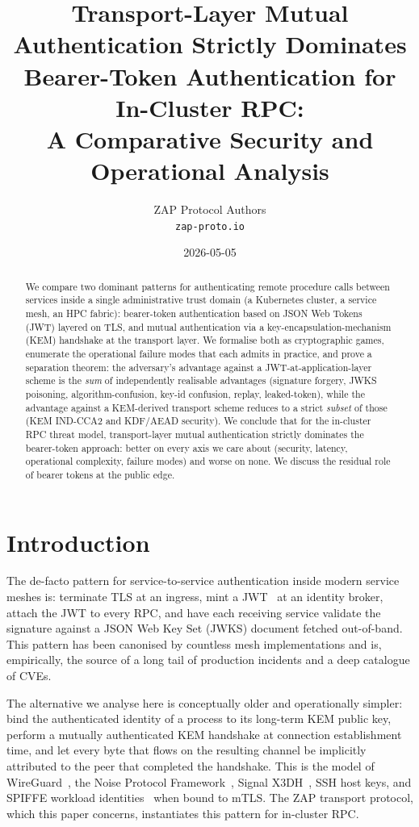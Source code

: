 \documentclass[11pt,a4paper]{article}
\title{Transport-Layer Mutual Authentication Strictly Dominates\\
       Bearer-Token Authentication for In-Cluster RPC:\\
       A Comparative Security and Operational Analysis}
\author{ZAP Protocol Authors\\
        \texttt{zap-proto.io}}
\date{2026-05-05}
\theoremstyle{plain}
\theoremstyle{definition}
\begin{document}
\maketitle

\begin{abstract}
We compare two dominant patterns for authenticating remote procedure calls
between services inside a single administrative trust domain (a Kubernetes
cluster, a service mesh, an HPC fabric): bearer-token authentication based on
JSON Web Tokens (JWT) layered on TLS, and mutual authentication via a
key-encapsulation-mechanism (KEM) handshake at the transport layer. We
formalise both as cryptographic games, enumerate the operational failure
modes that each admits in practice, and prove a separation theorem: the
adversary's advantage against a JWT-at-application-layer scheme is the
\emph{sum} of independently realisable advantages (signature forgery, JWKS
poisoning, algorithm-confusion, key-id confusion, replay, leaked-token), while
the advantage against a KEM-derived transport scheme reduces to a strict
\emph{subset} of those (KEM IND-CCA2 and KDF/AEAD security).
We conclude that for the in-cluster RPC threat model, transport-layer mutual
authentication strictly dominates the bearer-token approach: better on every
axis we care about (security, latency, operational complexity, failure modes)
and worse on none. We discuss the residual role of bearer tokens at the
public edge.
\end{abstract}

\section{Introduction}
\label{sec:intro}

The de-facto pattern for service-to-service authentication inside modern
service meshes is: terminate TLS at an ingress, mint a JWT~\cite{rfc7519} at
an identity broker, attach the JWT to every RPC, and have each receiving
service validate the signature against a JSON Web Key Set (JWKS) document
fetched out-of-band. This pattern has been canonised by countless mesh
implementations and is, empirically, the source of a long tail of
production incidents and a deep catalogue of CVEs.

The alternative we analyse here is conceptually older and operationally
simpler: bind the authenticated identity of a process to its long-term KEM
public key, perform a mutually authenticated KEM handshake at connection
establishment time, and let every byte that flows on the resulting channel
be implicitly attributed to the peer that completed the handshake. This is
the model of WireGuard~\cite{donenfeld2017wireguard}, the Noise Protocol
Framework~\cite{perrin2018noise}, Signal X3DH~\cite{marlinspike2016x3dh},
SSH host keys, and SPIFFE workload
identities~\cite{spiffe} when bound to mTLS. The ZAP transport protocol,
which this paper concerns, instantiates this pattern for in-cluster RPC.
\end{document}
